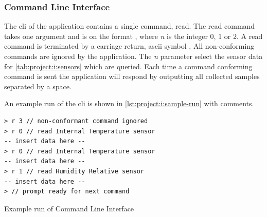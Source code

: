 \subsubsection{Command Line Interface}
The \gls{cli} of the {\tracker} application contains a single command, read.
The read command takes one argument and is on the format , where \emph{n} is the integer 0, 1 or 2.
A read command is terminated by a carriage return, ascii symbol \code{\\n}.
All non-conforming commands are ignored by the application.
The \emph{n} parameter select the sensor data for \autoref{tab:project:i:sensors} which are queried.
Each time a command conforming command is sent the application will respond by outputting all collected samples separated by a space.

An example run of the \gls{cli} is shown in \autoref{lst:project:i:sample-run} with comments.

\begin{listing}[H]
  \begin{verbatim}
> r 3 // non-conformant command ignored
> r 0 // read Internal Temperature sensor
-- insert data here --
> r 0 // read Internal Temperature sensor
-- insert data here --
> r 1 // read Humidity Relative sensor
-- insert data here --
> // prompt ready for next command
  \end{verbatim}
  \caption{Example run of Command Line Interface}
  \label{lst:project:i:sample-run}
\end{listing}

